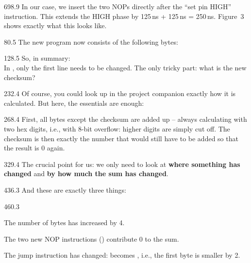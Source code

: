 \documentclass{aslab}
\begin{document}
\begin{region}[width=294]{698.9}
In our case, we insert the two NOPs directly after the ``set pin HIGH''
instruction. This extends the HIGH phase by
\blank
\hspace*{36bp}125\,ns + 125\,ns = 250\,ns.
\blank
Figure~3 shows exactly what this looks like.
\end{region}


\nextpage
\begin{region}{80.5}
The new program now consists of the following bytes:
\blank
{}
\end{region}

\begin{region}{128.5}
So, in summary:\\
In , only the first line needs to be changed.
\blank
The only tricky part: what is the new checksum?
\end{region}


\begin{region}{232.4}
Of course, you could look up in the project companion exactly how it is
calculated. But here, the essentials are enough:
\end{region}

\begin{region}[x=70.9]{268.4}
First, all bytes except the checksum are added up -- always calculating
with two hex digits, i.e., with 8-bit overflow: higher digits are simply
cut off. The checksum is then exactly the number that would still have to
be added so that the result is 0 again.
\end{region}

\begin{region}[pitch=13]{329.4}
The crucial point for us: we only need to look at \textbf{where something
has changed} and \textbf{by how much the sum has changed}.
\end{region}


\begin{region}{436.3}
And these are exactly three things:
\end{region}

\begin{region}[pitch=12.3]{460.3}
\begin{tasks}
\item The number of bytes has increased by 4.
\item The two new NOP instructions () contribute 0 to the
  sum.
\item The jump instruction has changed:  becomes ,
  i.e., the first byte is smaller by 2.
\end{tasks}
\end{region}
\end{document}

